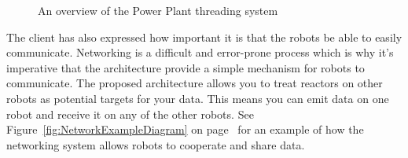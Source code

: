 \documentclass[english,12pt]{scrartcl}
\begin{document}
\begin{landscape}
\begin{figure}[b]
				\caption {An overview of the Power Plant threading system}
				\label{fig:PowerPlantThreadingOverviewDiagram}
			\end{figure}
			\end{landscape}

			The client has also expressed how important it is that the robots be able to easily
			communicate. Networking is a difficult and error-prone process which is why it's
			imperative that the architecture provide a simple mechanism for robots to communicate.
			The proposed architecture allows you to treat reactors on other robots as potential
			targets for your data. This means you can emit data on one robot and receive it on any
			of the other robots. See Figure~\ref{fig:NetworkExampleDiagram} on
			page~\pageref{fig:NetworkExampleDiagram} for an example of how the networking system
			allows robots to cooperate and share data.
\end{document}
